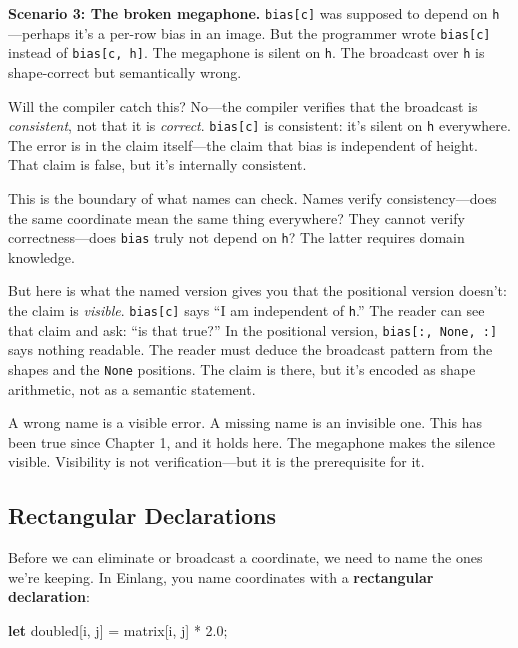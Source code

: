 \documentclass[11pt,titlepage]{article}
\newenvironment{Shaded}{}{}
\newcommand{\DecValTok}[1]{\textcolor[rgb]{0.25,0.63,0.44}{#1}}
\newcommand{\KeywordTok}[1]{\textcolor[rgb]{0.00,0.44,0.13}{\textbf{#1}}}
\newcommand{\NormalTok}[1]{#1}
\newcommand{\OperatorTok}[1]{\textcolor[rgb]{0.40,0.40,0.40}{#1}}
\begin{document}
\textbf{Scenario 3: The broken megaphone.} \texttt{bias{[}c{]}} was
supposed to depend on \texttt{h}---perhaps it's a per-row bias in an
image. But the programmer wrote \texttt{bias{[}c{]}} instead of
\texttt{bias{[}c,\ h{]}}. The megaphone is silent on \texttt{h}. The
broadcast over \texttt{h} is shape-correct but semantically wrong.

Will the compiler catch this? No---the compiler verifies that the
broadcast is \emph{consistent}, not that it is \emph{correct}.
\texttt{bias{[}c{]}} is consistent: it's silent on \texttt{h}
everywhere. The error is in the claim itself---the claim that bias is
independent of height. That claim is false, but it's internally
consistent.

This is the boundary of what names can check. Names verify
consistency---does the same coordinate mean the same thing everywhere?
They cannot verify correctness---does \texttt{bias} truly not depend on
\texttt{h}? The latter requires domain knowledge.

But here is what the named version gives you that the positional version
doesn't: the claim is \emph{visible}. \texttt{bias{[}c{]}} says ``I am
independent of \texttt{h}.'' The reader can see that claim and ask: ``is
that true?'' In the positional version, \texttt{bias{[}:,\ None,\ :{]}}
says nothing readable. The reader must deduce the broadcast pattern from
the shapes and the \texttt{None} positions. The claim is there, but it's
encoded as shape arithmetic, not as a semantic statement.

A wrong name is a visible error. A missing name is an invisible one.
This has been true since Chapter 1, and it holds here. The megaphone
makes the silence visible. Visibility is not verification---but it is
the prerequisite for it.

\vspace{2em}

\hypertarget{rectangular-declarations}{%
\subsection{Rectangular Declarations}\label{rectangular-declarations}}

Before we can eliminate or broadcast a coordinate, we need to name the
ones we're keeping. In Einlang, you name coordinates with a
\textbf{rectangular declaration}:

\begin{Shaded}
\begin{Highlighting}[]
\KeywordTok{let}\NormalTok{ doubled}\OperatorTok{[}\NormalTok{i, j}\OperatorTok{]}\NormalTok{ = matrix}\OperatorTok{[}\NormalTok{i, j}\OperatorTok{]}\NormalTok{ * }\DecValTok{2.0}\NormalTok{;}
\end{Highlighting}
\end{Shaded}
\end{document}
